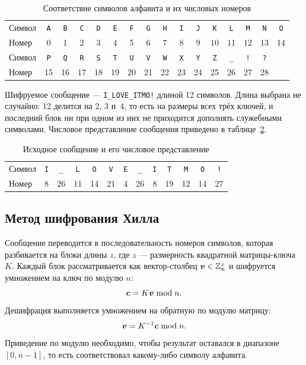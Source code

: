 \documentclass[a4paper,14pt]{extarticle}
\begin{document}
\begin{table}[H]
\caption{Соответствие символов алфавита и их числовых номеров}
\label{tab:alphabet}
\centering\footnotesize\setlength{\tabcolsep}{3.4pt}
\begin{tabular}{l|ccccccccccccccc}
\toprule
Символ & \texttt{A} & \texttt{B} & \texttt{C} & \texttt{D} & \texttt{E} & \texttt{F} & \texttt{G} & \texttt{H} & \texttt{I} & \texttt{J} & \texttt{K} & \texttt{L} & \texttt{M} & \texttt{N} & \texttt{O} \\
Номер & 0 & 1 & 2 & 3 & 4 & 5 & 6 & 7 & 8 & 9 & 10 & 11 & 12 & 13 & 14 \\
\midrule
Символ & \texttt{P} & \texttt{Q} & \texttt{R} & \texttt{S} & \texttt{T} & \texttt{U} & \texttt{V} & \texttt{W} & \texttt{X} & \texttt{Y} & \texttt{Z} & \texttt{\_} & \texttt{!} & \texttt{?} &  \\
Номер & 15 & 16 & 17 & 18 & 19 & 20 & 21 & 22 & 23 & 24 & 25 & 26 & 27 & 28 &  \\
\bottomrule
\end{tabular}
\end{table}

Шифруемое сообщение --- \texttt{I\_LOVE\_ITMO!} длиной 12 символов.
Длина выбрана не случайно: 12 делится на 2, 3 и~4, то есть на размеры всех трёх
ключей, и последний блок ни при одном из них не приходится дополнять служебными
символами. Числовое представление сообщения приведено в таблице~\ref{tab:message}.

\begin{table}[H]
\caption{Исходное сообщение и его числовое представление}
\label{tab:message}
\centering\footnotesize\setlength{\tabcolsep}{4.5pt}
\begin{tabular}{l|cccccccccccc}
\toprule
Символ & \texttt{I} & \texttt{\_} & \texttt{L} & \texttt{O} & \texttt{V} & \texttt{E} & \texttt{\_} & \texttt{I} & \texttt{T} & \texttt{M} & \texttt{O} & \texttt{!} \\
Номер & 8 & 26 & 11 & 14 & 21 & 4 & 26 & 8 & 19 & 12 & 14 & 27 \\
\bottomrule
\end{tabular}
\end{table}

\subsection{Метод шифрования Хилла}

Сообщение переводится в последовательность номеров символов, которая разбивается на
блоки длины $z$, где $z$ --- размерность квадратной матрицы-ключа $K$. Каждый блок
рассматривается как вектор-столбец $\boldsymbol{v} \in \mathbb{Z}_n^{z}$ и шифруется
умножением на ключ по модулю $n$:
\begin{equation}
  \boldsymbol{c} = K\boldsymbol{v} \bmod n .
  \label{eq:enc}
\end{equation}
Дешифрация выполняется умножением на обратную по модулю матрицу:
\begin{equation}
  \boldsymbol{v} = K^{-1}\boldsymbol{c} \bmod n .
  \label{eq:dec}
\end{equation}
Приведение по модулю необходимо, чтобы результат оставался в диапазоне $[0, n-1]$,
то есть соответствовал какому-либо символу алфавита.
\end{document}
